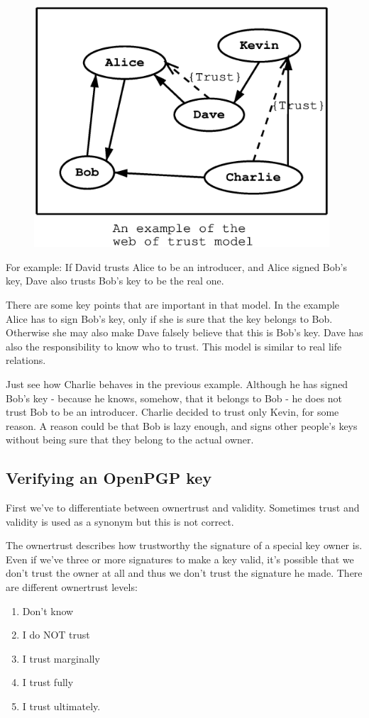 \begin{figure}[hbtp]
\includegraphics[height=9cm,width=11cm]{pgp-fig1}
\label{fig:pgp1}
\end{figure}

For example: If David trusts Alice to be an introducer, and Alice signed
Bob's key, Dave also trusts Bob's key to be the real one.

There are some key points that are important in that model. In the example
Alice has to sign Bob's key, only if she is sure that the key belongs
to Bob. Otherwise she may also make Dave falsely believe that this
is Bob's key. Dave has also the responsibility to know who to trust.
This model is similar to real life relations.

Just see how Charlie behaves in the previous example. Although he has 
signed Bob's key - because he knows, somehow, that it belongs to Bob - 
he does not trust Bob to be an introducer. Charlie decided to trust only 
Kevin, for some reason. A reason could be that Bob is lazy enough, and 
signs other people's keys without being sure that they belong to the 
actual owner.

\subsection{Verifying an OpenPGP key}
First we've to differentiate between ownertrust and validity. Sometimes trust
and validity is used as a synonym but this is not correct.
\par
The ownertrust describes how trustworthy the signature of a special
key owner is. Even if we've three or more signatures to make a key valid,
it's possible that we don't trust the owner at all and thus we don't trust 
the signature he made. There are different ownertrust levels:
\begin{enumerate}
\item Don't know
\item I do NOT trust
\item I trust marginally
\item I trust fully
\item I trust ultimately.
\end{enumerate}

